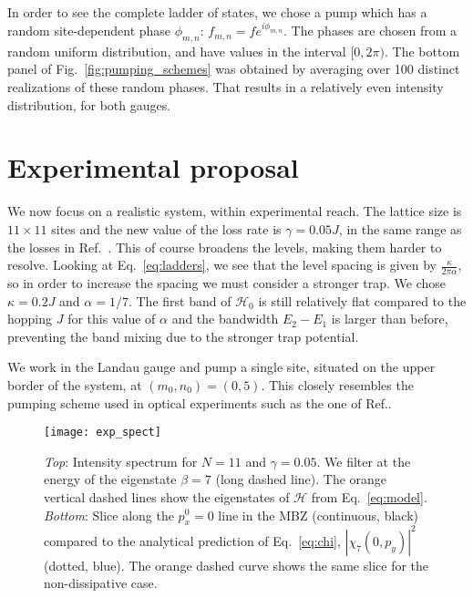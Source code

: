 \documentclass[twocolumn, 10pt, aps, superscriptaddress, floatfix, showpacs, pra, citeautoscript]{revtex4-1}
\newcommand{\co}[2]{#2}
\renewcommand{\paragraph}{\co}
\begin{document}
\paragraph{One must use a random phase in order to see all the states.}
In order to see the complete ladder of states, we chose a pump which
has a random site-dependent phase $\phi_{m,n}$:
$f_{m,n}=fe^{i\phi_{m,n}}$.  The phases are chosen from a random
uniform distribution, and have values in the interval $[0,2\pi)$. The
bottom panel of Fig.~\ref{fig:pumping_schemes} was obtained by
averaging over 100 distinct realizations of these random phases. That
results in a relatively even intensity distribution, for both gauges.

\section{Experimental proposal}
\label{sec:experiment}

\paragraph{Greater dissipation implies spectral broadening.}
We now focus on a realistic system, within experimental reach. The
lattice size is $11 \times 11$ sites and the new value of the loss
rate is $\gamma = 0.05 J$, in the same range as the losses in
Ref.~. This of course broadens the
levels, making them harder to resolve. Looking at
Eq.~\eqref{eq:ladders}, we see that the level spacing is given by
$\frac{\kappa}{2\pi\alpha}$, so in order to increase the spacing we
must consider a stronger trap. We chose $\kappa = 0.2 J$ and
$\alpha = 1/7$. The first band of $\mathcal{H}_0$ is still relatively
flat compared to the hopping $J$ for this value of $\alpha$ and the
bandwidth $E_2 - E_1$ is larger than before, preventing the band
mixing due to the stronger trap potential.

We work in the Landau gauge and pump a single site, situated on the
upper border of the system, at $(m_0,n_0)= (0,5)$. This closely
resembles the pumping scheme used in optical experiments such as the
one of Ref.\cite{hafezi2013imaging}. 

\begin{figure}[htb]
  \centering
  \texttt{[image: exp\_spect]} %
  \caption{\emph{Top}: Intensity spectrum for $N=11$ and
    $\gamma = 0.05$. We filter at the energy of the eigenstate
    $\beta=7$ (long dashed line). The orange vertical dashed lines
    show the eigenstates of $\mathcal{H}$ from Eq.~\eqref{eq:model}.
    \emph{Bottom}: Slice along the $p_x^0 = 0$ line in the MBZ
    (continuous, black) compared to the analytical prediction of
    Eq.~\eqref{eq:chi}, $|\chi_7(0,p_y)|^2$ (dotted, blue). The orange
    dashed curve shows the same slice for the non-dissipative case.}

  \label{fig:exp_spectrum}
\end{figure}
\end{document}
